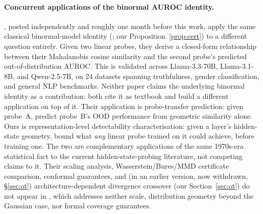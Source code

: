 \documentclass[onecolumn]{jmlr}
\begin{document}
\paragraph{Concurrent applications of the binormal AUROC identity.}
\citet{ying2026comparing}, posted independently and roughly one month
before this work, apply the same classical binormal-model identity
(\citealp{green1966signal,bamber1975area,hanley1982meaning}; our
Proposition~\ref{prop:cert}) to a different question entirely. Given
two linear probes, they derive a closed-form relationship between
their Mahalanobis cosine similarity and the second probe's predicted
out-of-distribution AUROC. This is validated across Llama-3.3-70B,
Llama-3.1-8B, and Qwen-2.5-7B, on 24 datasets spanning truthfulness,
gender classification, and general NLP benchmarks. Neither paper
claims the underlying binormal identity as a contribution: both cite
it as textbook and build a different application on top of it. Their
application is probe-transfer prediction: given probe~A, predict
probe~B's OOD performance from geometric similarity alone. Ours is
representation-level detectability characterisation: given a layer's
hidden-state geometry, bound what \emph{any} linear probe trained on it
could achieve, before training one. The two are complementary
applications of the same 1970s-era statistical fact to the current
hidden-state-probing literature, not competing claims to it. Their
scaling analysis, Wasserstein/Bures/MMD certificate comparison,
conformal guarantees, and (in an earlier version, now withdrawn, \S\ref{sec:ot}) architecture-dependent divergence crossover
(our Section~\ref{sec:ot}) do not appear in \citet{ying2026comparing},
which addresses neither scale, distribution geometry beyond the
Gaussian case, nor formal coverage guarantees.
\end{document}
